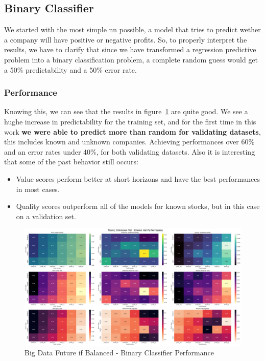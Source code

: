 \documentclass[11pt,english,a4paper,hidelinks]{book}
\begin{document}
\subsection{Binary Classifier}

\noindent We started with the most simple \acrshort{nn} possible, a model that tries to predict wether a company will have positive or negative profits. So, to properly interpret the results, we have to clarify that since we have transformed a regression predictive problem into a binary classification problem, a complete random guess would get a 50\% predictability and a 50\% error rate.

\subsubsection{Performance}
Knowing this, we can see that the results in figure~\ref{fig:binary_classifier} are quite good. We see a hughe increase in predictability for the training set, and for the first time in this work \textbf{we were able to predict more than random for validating datasets}, this includes known and unknown companies. Achieving performances over 60\% and an error rates under 40\%, for both validating datasets. Also it is interesting that some of the past behavior still occurs:
\begin{itemize}
    \item Value scores perform better at short horizons and have the best performances in most cases.
    \item Quality scores outperform all of the models for known stocks, but in this case on a validation set.
\end{itemize}

\begin{figure}[H]
    \centering
    \includegraphics[width=1\textwidth]{images/code/models/neural_network/binary_classifier_nn/Big Data future - IF HARD Balanced/performance summary.png}
    \caption{Big Data Future \acrshort{if} Balanced - Binary Classifier Performance}
    \label{fig:binary_classifier}
\end{figure}
\end{document}

